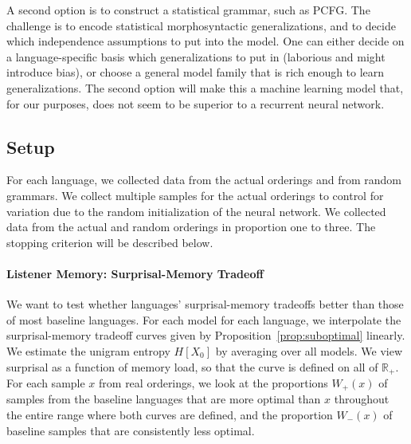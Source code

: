 \documentclass[11pt,letterpaper]{article}
\begin{document}
A second option is to construct a statistical grammar, such as PCFG.
The challenge is to encode statistical morphosyntactic generalizations, and to decide which independence assumptions to put into the model.
One can either decide on a language-specific basis which generalizations to put in (laborious and might introduce bias), or choose a general model family that is rich enough to learn generalizations.
The second option will make this a machine learning model that, for our purposes, does not seem to be superior to a recurrent neural network.





\subsection{Setup}

For each language, we collected data from the actual orderings and from random grammars.
We collect multiple samples for the actual orderings to control for variation due to the random initialization of the neural network.
We collected data from the actual and random orderings in proportion one to three.
The stopping criterion will be described below.



\paragraph{Listener Memory: Surprisal-Memory Tradeoff}
We want to test whether languages' surprisal-memory tradeoffs better than those of most baseline languages.
For each model for each language, we interpolate the surprisal-memory tradeoff curves given by Proposition~\ref{prop:suboptimal} linearly.
We estimate the unigram entropy $H[X_0]$ by averaging over all models.
We view surprisal as a function of memory load, so that the curve is defined on all of $\mathbb{R}_+$.
For each sample $x$ from real orderings, we look at the proportions $W_+(x)$ of samples from the baseline languages that are more optimal than $x$ throughout the entire range where both curves are defined, and the proportion $W_-(x)$ of baseline samples that are consistently less optimal.
\end{document}
